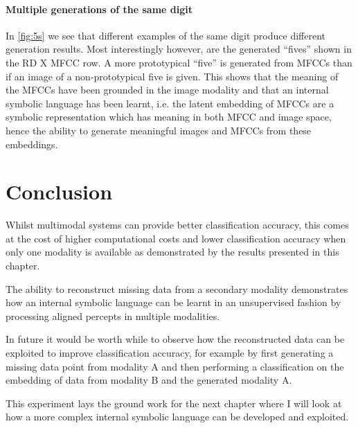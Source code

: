 \paragraph{Multiple generations of the same digit}
In \autoref{fig:5s} we see that different examples of the same digit produce different generation results. Most interestingly however, are the generated ``fives'' shown in the RD X MFCC row. A more prototypical ``five'' is generated from MFCCs than if an image of a non-prototypical five is given. This shows that the meaning of the MFCCs have been grounded in the image modality and that an internal symbolic language has been learnt, i.e. the latent embedding of MFCCs are a symbolic representation which has meaning in both MFCC and image space, hence the ability to generate meaningful images and MFCCs from these embeddings.

\section{Conclusion}
Whilst multimodal systems can provide better classification accuracy, this comes at the cost of higher computational costs and lower classification accuracy when only one modality is available as demonstrated by the results presented in this chapter.

The ability to reconstruct missing data from a secondary modality demonstrates how an internal symbolic language can be learnt in an unsupervised fashion by processing aligned percepts in multiple modalities.

In future it would be worth while to observe how the reconstructed data can be exploited to improve classification accuracy, for example by first generating a missing data point from modality A and then performing a classification on the embedding of data from modality B and the generated modality A.

This experiment lays the ground work for the next chapter where I will look at how a more complex internal symbolic language can be developed and exploited. 
